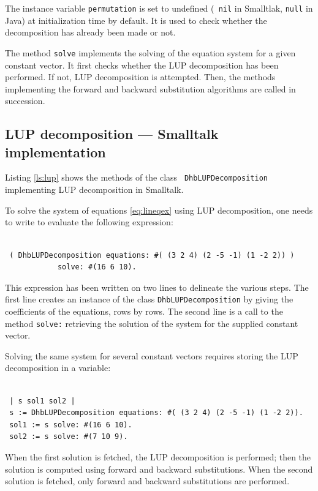 \documentclass[twoside]{book}
\begin{document}
The instance variable {\tt permutation} is set to undefined ({\tt
nil} in Smalltlak, {\tt null} in Java) at initialization time by
default. It is used to check whether the decomposition has already
been made or not.

The method {\tt solve} implements the solving of the equation
system for a given constant vector. It first checks whether the
LUP decomposition has been performed. If not, LUP decomposition is
attempted. Then, the methods implementing the forward and backward
substitution algorithms are called in succession.

\subsection{LUP decomposition --- Smalltalk implementation}
Listing \ref{ls:lup} shows the methods of the class {\tt
DhbLUPDecomposition} implementing LUP decomposition in Smalltalk.

To solve the system of equations \ref{eq:lineqex} using LUP
decomposition, one needs to write to evaluate the following
expression:
\begin{codeExample}
\begin{verbatim}

 ( DhbLUPDecomposition equations: #( (3 2 4) (2 -5 -1) (1 -2 2)) )
            solve: #(16 6 10).
\end{verbatim}
\end{codeExample}
This expression has been written on two lines to delineate the
various steps. The first line creates an instance of the class
{\tt DhbLUPDecomposition} by giving the coefficients of the
equations, rows by rows. The second line is a call to the method
{\tt solve:} retrieving the solution of the system for the
supplied constant vector.

Solving the same system for several constant vectors requires
storing the LUP decomposition in a variable:
\begin{codeExample}
\begin{verbatim}

 | s sol1 sol2 |
 s := DhbLUPDecomposition equations: #( (3 2 4) (2 -5 -1) (1 -2 2)).
 sol1 := s solve: #(16 6 10).
 sol2 := s solve: #(7 10 9).
\end{verbatim}
\end{codeExample}
When the first solution is fetched, the LUP decomposition is
performed; then the solution is computed using forward and
backward substitutions. When the second solution is fetched, only
forward and backward substitutions are performed.
\end{document}
